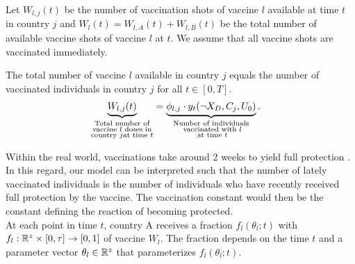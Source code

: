 Let $W_{l,j}(t)$ be the number of vaccination shots of vaccine $l$ available at time $t$ in country $j$ and $W_l(t) = W_{l,A}(t) + W_{l,B}(t)$ be the total number of available vaccine shots of vaccine $l$ at $t$. We assume that all vaccine shots are vaccinated immediately.
\begin{assumption}
\label{ass:vacc_immediately}
The total number of vaccine $l$ available in country $j$ equals the number of vaccinated individuals in country $j$ for all $t \in [0, T]$. 
\begin{align}
\label{eq:vaccine_country}
\underbrace{W_{l,j}(t)}_{\substack{\text{Total number of} \\ \text{vaccine } l \text{ doses in} \\ \text{country } j \text{at time } t}} &= \underbrace{\phi_{l, j} \cdot y_t(\neg X_D, C_j, U_0)}_{\substack{\text{Number of individuals} \\ \text{ vaccinated with } l \\ \text{ at time } t}}  . 
\end{align}
\end{assumption}
\noindent Within the real world, vaccinations take around 2 weeks to yield full protection \citep{cdc.2021}. In this regard, our model can be interpreted such that the number of lately vaccinated individuals is the number of individuals who have recently received full protection by the vaccine. The vaccination constant would then be the constant defining the reaction of becoming protected. \\

At each point in time $t$, country A receives a fraction $f_{l}(\theta_l; t)$ with $f_{l}: \mathbb{R}^{z} \times [0, \tau] \to [0,1]$ of vaccine $W_l$. The fraction depends on the time $t$ and a parameter vector $\theta_l \in \mathbb{R}^{z}$ that parameterizes $f_{l}(\theta_l; t)$.\\

